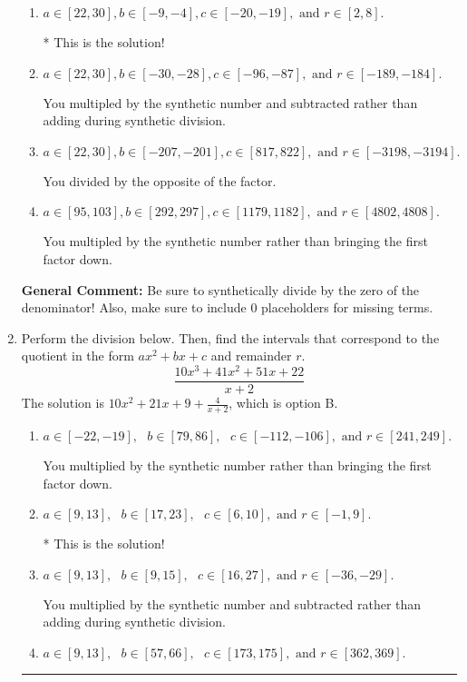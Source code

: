 \documentclass{extbook}[14pt]
\newcommand{\litem}[1]{\item #1

\rule{\textwidth}{0.4pt}}
\begin{document}
\begin{enumerate}
{\begin{enumerate}[label=\Alph*.]
 You divided by the opposite of the factor AND multipled the first factor rather than just bringing it down.
\item \( a \in [22, 30], b \in [-9, -4], c \in [-20, -19], \text{ and } r \in [2, 8]. \)

* This is the solution!
\item \( a \in [22, 30], b \in [-30, -28], c \in [-96, -87], \text{ and } r \in [-189, -184]. \)

 You multipled by the synthetic number and subtracted rather than adding during synthetic division.
\item \( a \in [22, 30], b \in [-207, -201], c \in [817, 822], \text{ and } r \in [-3198, -3194]. \)

 You divided by the opposite of the factor.
\item \( a \in [95, 103], b \in [292, 297], c \in [1179, 1182], \text{ and } r \in [4802, 4808]. \)

 You multipled by the synthetic number rather than bringing the first factor down.
\end{enumerate}

\textbf{General Comment:} Be sure to synthetically divide by the zero of the denominator! Also, make sure to include 0 placeholders for missing terms.
}
\litem{
Perform the division below. Then, find the intervals that correspond to the quotient in the form $ax^2+bx+c$ and remainder $r$.
\[ \frac{10x^{3} +41 x^{2} +51 x + 22}{x + 2} \]The solution is \( 10x^{2} +21 x + 9 + \frac{4}{x + 2} \), which is option B.\begin{enumerate}[label=\Alph*.]
\item \( a \in [-22, -19], \text{   } b \in [79, 86], \text{   } c \in [-112, -106], \text{   and   } r \in [241, 249]. \)

 You multiplied by the synthetic number rather than bringing the first factor down.
\item \( a \in [9, 13], \text{   } b \in [17, 23], \text{   } c \in [6, 10], \text{   and   } r \in [-1, 9]. \)

* This is the solution!
\item \( a \in [9, 13], \text{   } b \in [9, 15], \text{   } c \in [16, 27], \text{   and   } r \in [-36, -29]. \)

 You multiplied by the synthetic number and subtracted rather than adding during synthetic division.
\item \( a \in [9, 13], \text{   } b \in [57, 66], \text{   } c \in [173, 175], \text{   and   } r \in [362, 369]. \)


\end{enumerate}}
\end{enumerate}
\end{document}
